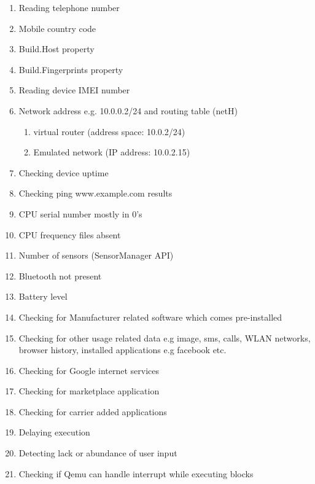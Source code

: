 \documentclass[../main.tex]{subfile}
\begin{document}
	\begin{enumerate}
		\item Reading telephone number \cite{sophos_anti_emulation} \cite{vidas2014evading}
		\item Mobile country code \cite{vidas2014evading}
		\item Build.Host property \cite{sophos_anti_emulation} \cite{vidas2014evading}
		\item Build.Fingerprints property \cite{sophos_anti_emulation}\cite{vidas2014evading}
		\item Reading device IMEI number
		\item Network address e.g. 10.0.0.2/24 and routing table (netH) \cite{vidas2014evading}
		\begin{enumerate}
			\item virtual router (address space: 10.0.2/24)
			\item Emulated network (IP address: 10.0.2.15)
		\end{enumerate}
		\item Checking device uptime
		\item Checking ping www.example.com results
		\item CPU serial number mostly in 0's \cite{vidas2014evading}
		\item CPU frequency files absent \cite{vidas2014evading}
		\item Number of sensors (SensorManager API) \cite{vidas2014evading}
		\item Bluetooth not present \cite{vidas2014evading}
		\item Battery level \cite{vidas2014evading}
		\item Checking for Manufacturer related software which comes pre-installed \cite{vidas2014evading}
		\item Checking for other usage related data e.g image, sms, calls, WLAN networks, browser history, installed applications e.g facebook etc.
		\item Checking for Google internet services \cite{vidas2014evading}
		\item Checking for marketplace application \cite{vidas2014evading}
		\item Checking for carrier added applications \cite{vidas2014evading}
		\item Delaying execution \cite{sophos_anti_emulation}
		\item Detecting lack or abundance of user input
		\item Checking if Qemu can handle interrupt while executing blocks \cite{sophos_anti_emulation}

\end{enumerate}
\end{document}
